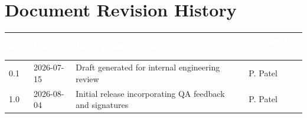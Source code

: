 \vspace{0.5cm}
\section{Document Revision History}
\begin{tabularx}{\linewidth}{@{}l l X l@{}}
\toprule
\rowcolor{eqnavy}
\textcolor{white}{\textbf{Rev}} & \textcolor{white}{\textbf{Date}} & \textcolor{white}{\textbf{Description of Change}} & \textcolor{white}{\textbf{Prepared By}} \\
\midrule
0.1 & 2026-07-15 & Draft generated for internal engineering review & P. Patel \\
1.0 & 2026-08-04 & Initial release incorporating QA feedback and signatures & P. Patel \\
\bottomrule
\end{tabularx}
